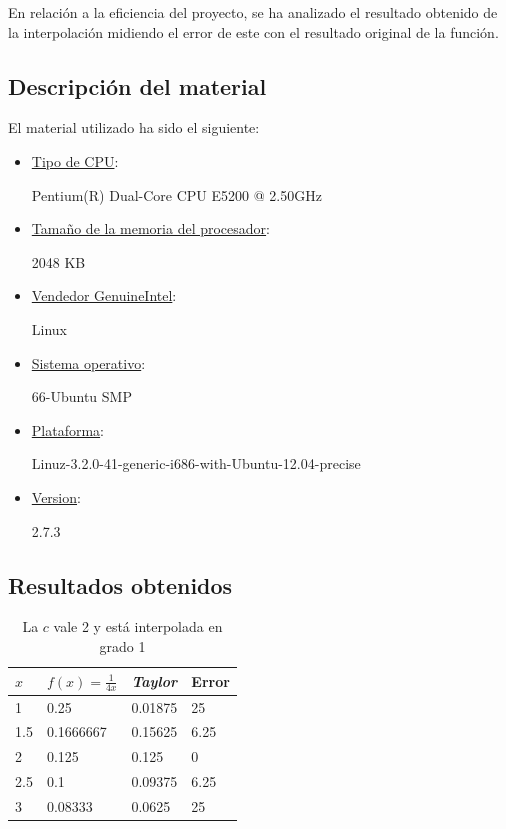 \documentclass[a4paper,12pt]{article}
\begin{document}
En relación a la eficiencia del proyecto, se ha analizado el resultado obtenido de la interpolación midiendo el error de este con el resultado original de la función.  
\subsection{Descripción del material}
El material utilizado ha sido el siguiente:
\begin {itemize}
\item \underline{Tipo de CPU}: 
 
 
 Pentium(R) Dual-Core CPU E5200 @ 2.50GHz 

\item \underline{Tamaño de la memoria del procesador}: 


 2048 KB

\item \underline{Vendedor GenuineIntel}:


Linux

\item \underline{Sistema operativo}:


 66-Ubuntu SMP

\item \underline{Plataforma}:


 Linuz-3.2.0-41-generic-i686-with-Ubuntu-12.04-precise

\item \underline{Version}:

2.7.3
\end{itemize}

\newpage
\subsection{Resultados obtenidos}
\begin{table}[!hbt]
\begin{center}
\begin{tabular}[c]{||l | l ||l|l||}
\hline
\hline
$x$  & $f(x)=\frac{1}{4x}$ &{\em Taylor} & Error \\
\hline
1 &0.25& 0.01875 & 25\\
\hline
1.5 &0.1666667&0.15625& 6.25\\
\hline
2 &0.125 &0.125 &  0 \\
\hline
2.5 &0.1 &0.09375 &  6.25 \\
\hline
3 &  0.08333 &  0.0625 &  25 \\
\hline
\hline
\end{tabular}
\caption{La $c$ vale 2 y está interpolada en grado 1}
\end{center}
\end{table}
\end{document}
